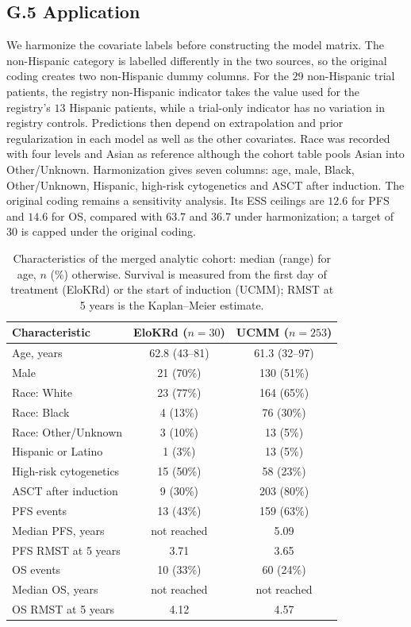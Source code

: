 \documentclass[11pt]{article}
\theoremstyle{definition}
\theoremstyle{plain}
\begin{document}
\subsection*{G.5 Application}

We harmonize the covariate labels before constructing the model matrix. The non-Hispanic category is labelled differently in the two sources, so the original coding creates two non-Hispanic dummy columns. For the $29$ non-Hispanic trial patients, the registry non-Hispanic indicator takes the value used for the registry's $13$ Hispanic patients, while a trial-only indicator has no variation in registry controls. Predictions then depend on extrapolation and prior regularization in each model as well as the other covariates. Race was recorded with four levels and Asian as reference although the cohort table pools Asian into Other/Unknown. Harmonization gives seven columns: age, male, Black, Other/Unknown, Hispanic, high-risk cytogenetics and ASCT after induction. The original coding remains a sensitivity analysis. Its ESS ceilings are $12.6$ for PFS and $14.6$ for OS, compared with $63.7$ and $36.7$ under harmonization; a target of $30$ is capped under the original coding.


\begin{table}[htbp]
\centering
\caption{Characteristics of the merged analytic cohort: median (range) for age, $n$ (\%) otherwise. Survival is measured from the first day of treatment (EloKRd) or the start of induction (UCMM); RMST at 5 years is the Kaplan--Meier estimate.}
\label{tab:baseline}
\small
\begin{tabular}{lcc}
\toprule
Characteristic & EloKRd ($n=30$) & UCMM ($n=253$) \\
\midrule
Age, years & 62.8 (43--81) & 61.3 (32--97) \\
Male & 21 (70\%) & 130 (51\%) \\
Race: White & 23 (77\%) & 164 (65\%) \\
Race: Black & 4 (13\%) & 76 (30\%) \\
Race: Other/Unknown & 3 (10\%) & 13 (5\%) \\
Hispanic or Latino & 1 (3\%) & 13 (5\%) \\
High-risk cytogenetics & 15 (50\%) & 58 (23\%) \\
ASCT after induction & 9 (30\%) & 203 (80\%) \\
PFS events & 13 (43\%) & 159 (63\%) \\
Median PFS, years & not reached & 5.09 \\
PFS RMST at 5 years & 3.71 & 3.65 \\
OS events & 10 (33\%) & 60 (24\%) \\
Median OS, years & not reached & not reached \\
OS RMST at 5 years & 4.12 & 4.57 \\
\bottomrule
\end{tabular}
\end{table}
\end{document}
